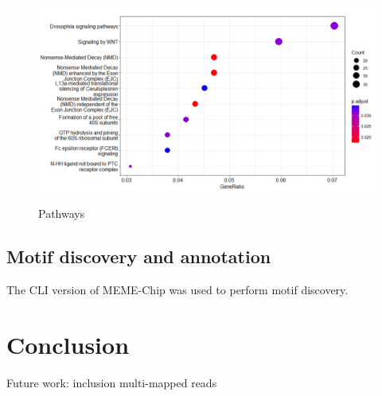 \documentclass{article}
\begin{document}
\begin{figure}[h]
\caption{Pathways}
\centering
\includegraphics{pathways.png}
\label{fig:pathways}
\end{figure}

\subsection{Motif discovery and annotation}

The CLI version of MEME-Chip\cite{machanick2011meme} was used to perform motif discovery. 



\section{Conclusion}
Future work:
inclusion multi-mapped reads\cite{chung2011discovering}

\printbibliography

\appendix
\end{document}
